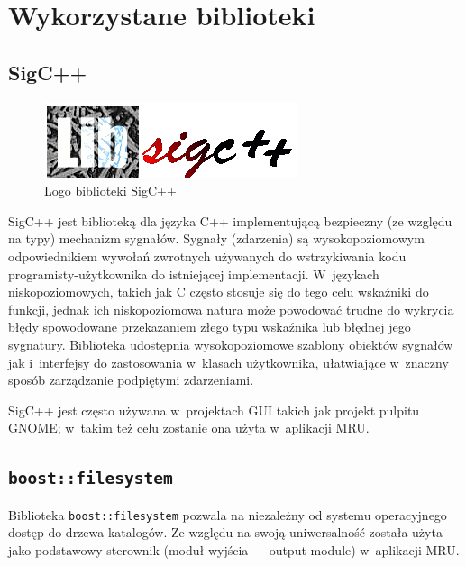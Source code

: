 
\section{Wykorzystane biblioteki}
\label{wykorzystane-biblioteki}

\subsection{SigC++}
\begin{figure}
\begin{center}
\includegraphics[scale=0.50]{img/sigcpp_logo.png}
\end{center}
\caption{Logo biblioteki SigC++}
\end{figure}
\par
SigC++ jest biblioteką dla języka C++ implementującą bezpieczny (ze względu na typy) mechanizm sygnałów.
Sygnały (zdarzenia) są wysokopoziomowym odpowiednikiem wywołań zwrotnych używanych do wstrzykiwania kodu programisty-użytkownika do istniejącej implementacji. W~językach niskopoziomowych, takich jak C często stosuje się do tego celu wskaźniki do funkcji, jednak ich niskopoziomowa natura może powodować trudne do wykrycia błędy spowodowane przekazaniem złego typu wskaźnika lub błędnej jego sygnatury. Biblioteka udostępnia wysokopoziomowe szablony obiektów sygnałów jak i~interfejsy do zastosowania w~klasach użytkownika, ułatwiające w~znaczny sposób zarządzanie podpiętymi zdarzeniami.\\
\par
SigC++ jest często używana w~projektach GUI takich jak projekt pulpitu GNOME; w~takim też celu zostanie ona użyta w~aplikacji MRU.

\subsection{\texttt{boost::filesystem}}
\par
Biblioteka \texttt{boost::filesystem} pozwala na niezależny od systemu operacyjnego dostęp do drzewa katalogów\cite{wiecej-niz-cpp-boost}. Ze względu na swoją uniwersalność została użyta jako podstawowy sterownik (moduł wyjścia --- output module) w~aplikacji MRU.

